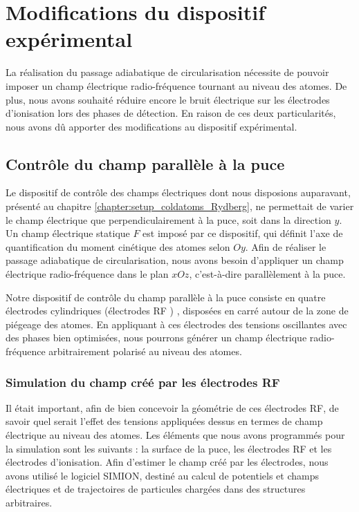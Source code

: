 \clearpage
\section{Modifications du dispositif expérimental}

\noindent La réalisation du passage adiabatique de circularisation nécessite de pouvoir imposer un champ électrique radio-fréquence tournant au niveau des atomes.
De plus, nous avons souhaité réduire encore le bruit électrique sur les électrodes d'ionisation lors des phases de détection.
En raison de ces deux particularités, nous avons dû apporter des modifications au dispositif expérimental.

 \subsection{Contrôle du champ parallèle à la puce}%
\noindent Le dispositif de contrôle des champs électriques dont nous disposions auparavant, présenté au chapitre \ref{chapter:setup_coldatoms_Rydberg}, ne permettait de varier le champ électrique que perpendiculairement à la puce, soit dans la direction $y$.
Un champ électrique statique $F$ est imposé par ce dispositif, qui définit l'axe de quantification du moment cinétique des atomes selon $Oy$.
Afin de réaliser le passage adiabatique de circularisation, nous avons besoin d'appliquer un champ électrique radio-fréquence %
dans le plan $xOz$, c'est-à-dire parallèlement à la puce. 

Notre dispositif de contrôle du champ parallèle à la puce consiste en quatre électrodes cylindriques (\og électrodes RF \fg{}) , disposées en carré autour de la zone de piégeage des atomes.
En appliquant à ces électrodes des tensions oscillantes avec des phases bien optimisées, nous pourrons générer un champ électrique radio-fréquence arbitrairement polarisé au niveau des atomes.

\subsubsection*{Simulation du champ créé par les électrodes RF}
\noindent Il était important, afin de bien concevoir la géométrie de ces électrodes RF, de savoir quel serait l'effet des tensions appliquées dessus en termes de champ électrique au niveau des atomes.
Les éléments que nous avons programmés pour la simulation sont les suivants : la surface de la puce, les électrodes RF et les électrodes d'ionisation.
Afin d'estimer le champ créé par les électrodes, nous avons utilisé le logiciel SIMION, destiné au calcul de potentiels et champs électriques et de trajectoires de particules chargées dans des structures arbitraires.

